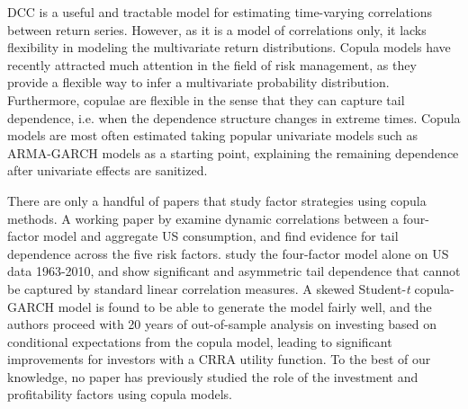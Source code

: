 DCC is a useful and tractable model for estimating time-varying correlations between return series. However, as it is a model of correlations only, it lacks flexibility in modeling the multivariate return distributions. Copula models have recently attracted much attention in the field of risk management, as they provide a flexible way to infer a multivariate probability distribution. Furthermore, copulae are flexible in the sense that they can capture tail dependence, i.e. when the dependence structure changes in extreme times. Copula models are most often estimated taking popular univariate models such as ARMA-GARCH models as a starting point, explaining the remaining dependence after univariate effects are sanitized. 

There are only a handful of papers that study factor strategies using copula methods. A working paper by \textcite{CholleteNing2012} examine dynamic correlations between a four-factor model and aggregate US consumption, and find evidence for tail dependence across the five risk factors. \textcite{ChristoffersenLanglois2013} study the four-factor model alone on US data 1963-2010, and show significant and asymmetric tail dependence that cannot be captured by standard linear correlation measures. A skewed Student-\textit{t} copula-GARCH model is found to be able to generate the model fairly well, and the authors proceed with 20 years of out-of-sample analysis on investing based on conditional expectations from the copula model, leading to significant improvements for investors with a CRRA utility function. To the best of our knowledge, no paper has previously studied the role of the investment and profitability factors using copula models.
